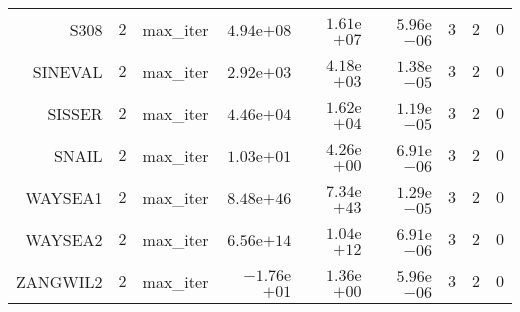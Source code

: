 \begin{longtable}{rrrrrrrrr}
S308 & \(     2\) & max\_iter & \( 4.94\)e\(+08\) & \( 1.61\)e\(+07\) & \( 5.96\)e\(-06\) & \(     3\) & \(     2\) & \(     0\) \\
SINEVAL & \(     2\) & max\_iter & \( 2.92\)e\(+03\) & \( 4.18\)e\(+03\) & \( 1.38\)e\(-05\) & \(     3\) & \(     2\) & \(     0\) \\
SISSER & \(     2\) & max\_iter & \( 4.46\)e\(+04\) & \( 1.62\)e\(+04\) & \( 1.19\)e\(-05\) & \(     3\) & \(     2\) & \(     0\) \\
SNAIL & \(     2\) & max\_iter & \( 1.03\)e\(+01\) & \( 4.26\)e\(+00\) & \( 6.91\)e\(-06\) & \(     3\) & \(     2\) & \(     0\) \\
WAYSEA1 & \(     2\) & max\_iter & \( 8.48\)e\(+46\) & \( 7.34\)e\(+43\) & \( 1.29\)e\(-05\) & \(     3\) & \(     2\) & \(     0\) \\
WAYSEA2 & \(     2\) & max\_iter & \( 6.56\)e\(+14\) & \( 1.04\)e\(+12\) & \( 6.91\)e\(-06\) & \(     3\) & \(     2\) & \(     0\) \\
ZANGWIL2 & \(     2\) & max\_iter & \(-1.76\)e\(+01\) & \( 1.36\)e\(+00\) & \( 5.96\)e\(-06\) & \(     3\) & \(     2\) & \(     0\) \\\hline
\end{longtable}
